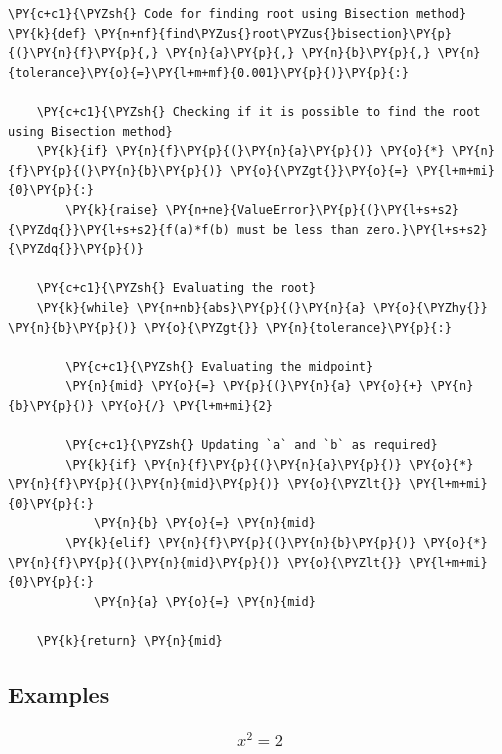     \begin{tcolorbox}[breakable, size=fbox, boxrule=1pt, pad at break*=1mm,colback=cellbackground, colframe=cellborder]
\begin{Verbatim}[commandchars=\\\{\}]
\PY{c+c1}{\PYZsh{} Code for finding root using Bisection method}
\PY{k}{def} \PY{n+nf}{find\PYZus{}root\PYZus{}bisection}\PY{p}{(}\PY{n}{f}\PY{p}{,} \PY{n}{a}\PY{p}{,} \PY{n}{b}\PY{p}{,} \PY{n}{tolerance}\PY{o}{=}\PY{l+m+mf}{0.001}\PY{p}{)}\PY{p}{:}

    \PY{c+c1}{\PYZsh{} Checking if it is possible to find the root using Bisection method}
    \PY{k}{if} \PY{n}{f}\PY{p}{(}\PY{n}{a}\PY{p}{)} \PY{o}{*} \PY{n}{f}\PY{p}{(}\PY{n}{b}\PY{p}{)} \PY{o}{\PYZgt{}}\PY{o}{=} \PY{l+m+mi}{0}\PY{p}{:}
        \PY{k}{raise} \PY{n+ne}{ValueError}\PY{p}{(}\PY{l+s+s2}{\PYZdq{}}\PY{l+s+s2}{f(a)*f(b) must be less than zero.}\PY{l+s+s2}{\PYZdq{}}\PY{p}{)}

    \PY{c+c1}{\PYZsh{} Evaluating the root}
    \PY{k}{while} \PY{n+nb}{abs}\PY{p}{(}\PY{n}{a} \PY{o}{\PYZhy{}} \PY{n}{b}\PY{p}{)} \PY{o}{\PYZgt{}} \PY{n}{tolerance}\PY{p}{:}

        \PY{c+c1}{\PYZsh{} Evaluating the midpoint}
        \PY{n}{mid} \PY{o}{=} \PY{p}{(}\PY{n}{a} \PY{o}{+} \PY{n}{b}\PY{p}{)} \PY{o}{/} \PY{l+m+mi}{2}

        \PY{c+c1}{\PYZsh{} Updating `a` and `b` as required}
        \PY{k}{if} \PY{n}{f}\PY{p}{(}\PY{n}{a}\PY{p}{)} \PY{o}{*} \PY{n}{f}\PY{p}{(}\PY{n}{mid}\PY{p}{)} \PY{o}{\PYZlt{}} \PY{l+m+mi}{0}\PY{p}{:}
            \PY{n}{b} \PY{o}{=} \PY{n}{mid}
        \PY{k}{elif} \PY{n}{f}\PY{p}{(}\PY{n}{b}\PY{p}{)} \PY{o}{*} \PY{n}{f}\PY{p}{(}\PY{n}{mid}\PY{p}{)} \PY{o}{\PYZlt{}} \PY{l+m+mi}{0}\PY{p}{:}
            \PY{n}{a} \PY{o}{=} \PY{n}{mid}

    \PY{k}{return} \PY{n}{mid}
\end{Verbatim}
\end{tcolorbox}

    \hypertarget{examples}{%
\subsection{Examples}\label{examples}}

    \hypertarget{x2-2}{%
\subsubsection{\texorpdfstring{\[x^2 = 2\]}{x\^{}2 = 2}}\label{x2-2}}

